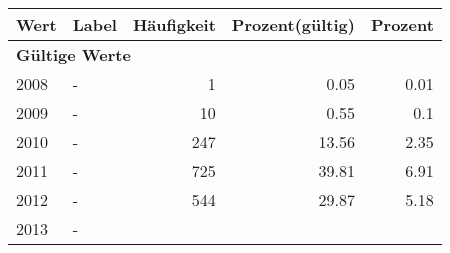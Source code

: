      \begin{longtable}{lXrrr}
     \toprule
     \textbf{Wert} & \textbf{Label} & \textbf{Häufigkeit} & \textbf{Prozent(gültig)} & \textbf{Prozent} \\
     \endhead
     \midrule
     \multicolumn{5}{l}{\textbf{Gültige Werte}}\\

     2008 &
     \multicolumn{1}{X}{ -  } &


       \num{1} &
       \num[round-mode=places,round-precision=2]{0.05} &
         \num[round-mode=places,round-precision=2]{0.01} \\

     2009 &
     \multicolumn{1}{X}{ -  } &


       \num{10} &
       \num[round-mode=places,round-precision=2]{0.55} &
         \num[round-mode=places,round-precision=2]{0.1} \\

     2010 &
     \multicolumn{1}{X}{ -  } &


       \num{247} &
       \num[round-mode=places,round-precision=2]{13.56} &
         \num[round-mode=places,round-precision=2]{2.35} \\

     2011 &
     \multicolumn{1}{X}{ -  } &


       \num{725} &
       \num[round-mode=places,round-precision=2]{39.81} &
         \num[round-mode=places,round-precision=2]{6.91} \\

     2012 &
     \multicolumn{1}{X}{ -  } &


       \num{544} &
       \num[round-mode=places,round-precision=2]{29.87} &
         \num[round-mode=places,round-precision=2]{5.18} \\

     2013 &
     \multicolumn{1}{X}{ -  } &



\end{longtable}
